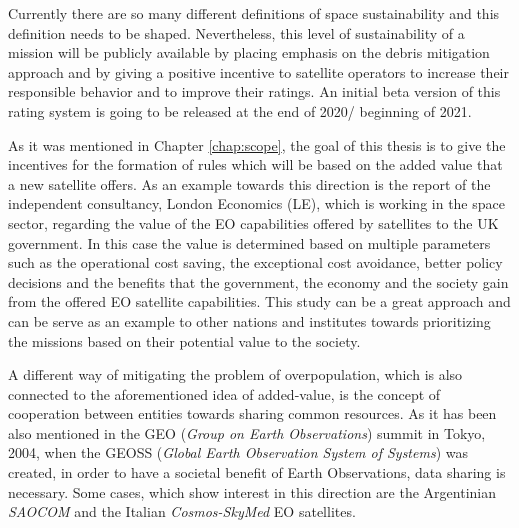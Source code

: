 Currently there are so many different definitions of space sustainability and this definition needs to be shaped. Nevertheless, this level of sustainability of a mission will be publicly available by placing emphasis on the debris mitigation approach and by giving a positive incentive to satellite operators to increase their responsible behavior and to improve their ratings. An initial beta version of this rating system is going to be released at the end of 2020/ beginning of 2021.



\bigskip
As it was mentioned in Chapter \ref{chap:scope}, the goal of this thesis is to give the incentives for the formation of rules which will be based on the added value that a new satellite offers. As an example towards this direction is the report of the independent consultancy, London Economics (LE), which is working in the space sector, regarding the value of the EO capabilities offered by satellites to the UK government. \cite{Value UK} In this case the value is determined based on multiple parameters such as the operational cost saving, the exceptional cost avoidance, better policy decisions and the benefits that the government, the economy and the society gain from the offered EO satellite capabilities. This study can be a great approach and can be serve as an example to other nations and institutes towards prioritizing the missions based on their potential value to the society.

A different way of mitigating the problem of overpopulation, which is also connected to the aforementioned idea of added-value, is the concept of cooperation between entities towards sharing common resources. As it has been also mentioned in the GEO (\textit{Group on Earth Observations}) summit in Tokyo, 2004, when the GEOSS (\textit{Global Earth Observation System of Systems}) was created, in order to have a societal benefit of Earth Observations, data sharing is necessary. \cite{Kramer 2002} %
Some cases, which show interest in this direction are the Argentinian \textit{SAOCOM} and the Italian \textit{Cosmos-SkyMed} EO satellites.  %

